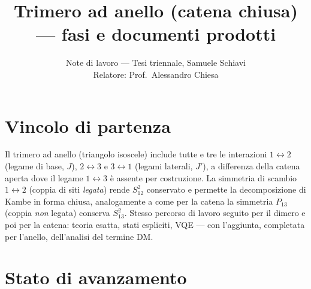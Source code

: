 \documentclass[11pt,a4paper]{article}
\title{Trimero ad anello (catena chiusa) — fasi e documenti prodotti}
\author{Note di lavoro — Tesi triennale, Samuele Schiavi\\ Relatore: Prof.\ Alessandro Chiesa}
\date{}
\begin{document}
\maketitle

\section{Vincolo di partenza}

Il trimero ad anello (triangolo isoscele) include tutte e tre le
interazioni $1\leftrightarrow2$ (legame di base, $J$),
$2\leftrightarrow3$ e $3\leftrightarrow1$ (legami laterali, $J'$),
a differenza della catena aperta dove il legame $1\leftrightarrow3$ è
assente per costruzione. La simmetria di scambio $1\leftrightarrow2$
(coppia di siti \emph{legata}) rende $S_{12}^2$ conservato e permette
la decomposizione di Kambe in forma chiusa, analogamente a come per la
catena la simmetria $P_{13}$ (coppia \emph{non} legata) conserva
$S_{13}^2$. Stesso percorso di lavoro seguito per il dimero e poi per
la catena: teoria esatta, stati espliciti, VQE — con l'aggiunta,
completata per l'anello, dell'analisi del termine DM.

\section{Stato di avanzamento}
\end{document}
